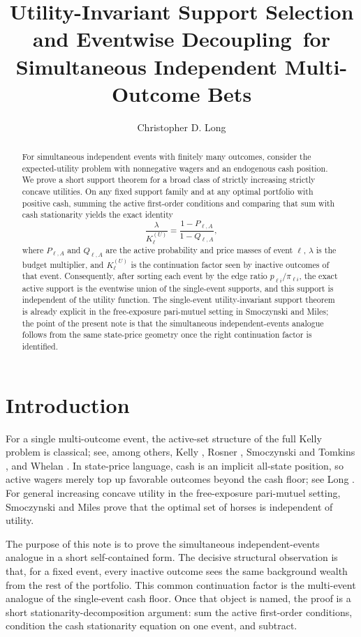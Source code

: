 \documentclass[11pt]{article}
\title{Utility-Invariant Support Selection and Eventwise Decoupling\
for Simultaneous Independent Multi-Outcome Bets}
\author{Christopher D. Long}
\date{}
\begin{document}
\maketitle

\begin{abstract}
For simultaneous independent events with finitely many outcomes, consider the expected-utility problem with nonnegative wagers and an endogenous cash position. We prove a short support theorem for a broad class of strictly increasing strictly concave utilities. On any fixed support family and at any optimal portfolio with positive cash, summing the active first-order conditions and comparing that sum with cash stationarity yields the exact identity
\[
\frac{\lambda}{K_{\ell}^{(U)}}=\frac{1-P_{\ell,A}}{1-Q_{\ell,A}},
\]
where $P_{\ell,A}$ and $Q_{\ell,A}$ are the active probability and price masses of event $\ell$, $\lambda$ is the budget multiplier, and $K_{\ell}^{(U)}$ is the continuation factor seen by inactive outcomes of that event. Consequently, after sorting each event by the edge ratio $p_{\ell i}/\pi_{\ell i}$, the exact active support is the eventwise union of the single-event supports, and this support is independent of the utility function. The single-event utility-invariant support theorem is already explicit in the free-exposure pari-mutuel setting in Smoczynski and Miles; the point of the present note is that the simultaneous independent-events analogue follows from the same state-price geometry once the right continuation factor is identified.
\end{abstract}

\section{Introduction}
For a single multi-outcome event, the active-set structure of the full Kelly problem is classical; see, among others, Kelly \cite{Kelly1956}, Rosner \cite{Rosner1975}, Smoczynski and Tomkins \cite{SmoczynskiTomkins2010}, and Whelan \cite{Whelan2023}. In state-price language, cash is an implicit all-state position, so active wagers merely top up favorable outcomes beyond the cash floor; see Long \cite{Long2026}. For general increasing concave utility in the free-exposure pari-mutuel setting, Smoczynski and Miles \cite{SmoczynskiMiles2025} prove that the optimal set of horses is independent of utility.

The purpose of this note is to prove the simultaneous independent-events analogue in a short self-contained form. The decisive structural observation is that, for a fixed event, every inactive outcome sees the same background wealth from the rest of the portfolio. This common continuation factor is the multi-event analogue of the single-event cash floor. Once that object is named, the proof is a short stationarity-decomposition argument: sum the active first-order conditions, condition the cash stationarity equation on one event, and subtract.
\end{document}
